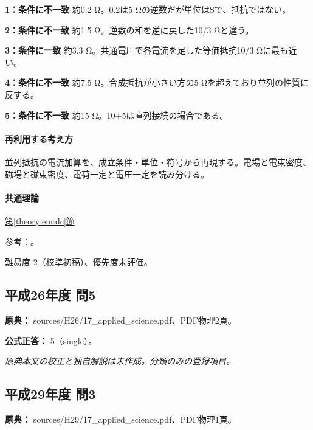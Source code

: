 \noindent\textbf{1：条件に不一致} 約0.2 Ω。0.2は5 Ωの逆数だが単位はSで、抵抗ではない。\par

\noindent\textbf{2：条件に不一致} 約1.5 Ω。逆数の和を逆に戻した10/3 Ωと違う。\par

\noindent\textbf{3：条件に一致} 約3.3 Ω。共通電圧で各電流を足した等価抵抗10/3 Ωに最も近い。\par

\noindent\textbf{4：条件に不一致} 約7.5 Ω。合成抵抗が小さい方の5 Ωを超えており並列の性質に反する。\par

\noindent\textbf{5：条件に不一致} 約15 Ω。10+5は直列接続の場合である。\par

\paragraph{再利用する考え方} 並列抵抗の電流加算を、成立条件・単位・符号から再現する。電場と電束密度、磁場と磁束密度、電荷一定と電圧一定を読み分ける。

\paragraph{共通理論} \hyperref[theory:em:dc]{第\ref*{theory:em:dc}節}

\par 参考：\cite{mit_em07}。

\par 難易度 2（校準初稿）、優先度未評価。

\subsection{平成26年度 問5}
\label{q:h26-reg-applied-05}

\noindent\textbf{原典：} sources/H26/17\_applied\_science.pdf、PDF物理2頁。

\textbf{公式正答：} 5（single）。

\par\textit{原典本文の校正と独自解説は未作成。分類のみの登録項目。}

\subsection{平成29年度 問3}
\label{q:h29-reg-applied-03}

\noindent\textbf{原典：} sources/H29/17\_applied\_science.pdf、PDF物理1頁。


